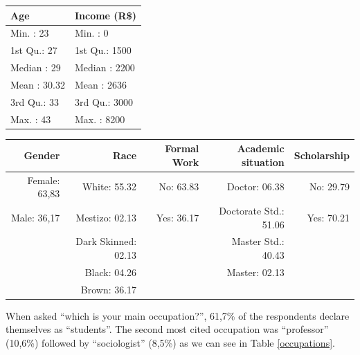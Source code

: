 \documentclass[a4paper, 12pt, openright, oneside, article, german, french, brazil, english]{abntex2}
\begin{document}
\begin{table}[ht]
	{\begin{tabular}{p{4cm}p{4cm}}
		\hline
		Age & Income (R\$) \\ 
		\hline
		Min.   : 23   & Min.   :   0   \\ 
		1st Qu.: 27   & 1st Qu.: 1500   \\ 
		Median : 29   & Median : 2200   \\ 
		Mean   : 30.32 & Mean   : 2636   \\ 
		3rd Qu.: 33   & 3rd Qu.: 3000   \\ 
		Max.   : 43   & Max.   : 8200   \\ 
		\hline
	\end{tabular}
}
	{}
\end{table}


\begin{table}[ht]
	{\begin{tabular}{rrrrr}
		\hline
		Gender & Race & Formal Work & Academic situation & Scholarship \\ 
		\hline
		Female: 63,83   & White: 55.32   & No: 63.83  & Doctor: 06.38   & No: 29.79 \\ 
		Male: 36,17      & Mestizo: 02.13   & Yes: 36.17 & Doctorate Std.: 51.06  & Yes: 70.21 \\ 
						 & Dark Skinned: 02.13   &  & Master Std.: 40.43 &  \\ 
					 	 & Black: 04.26   &  & Master: 02.13 &  \\ 
					 	 & Brown: 36.17   &  &  &  \\ 
		\hline
	\end{tabular}
}
	{}
\end{table}


When asked ``which is your main occupation?'', 61,7\% of the respondents declare themselves as ``students''. The second most cited occupation was ``professor'' (10,6\%) followed by ``sociologist'' (8,5\%) as we can see in Table \ref{occupations}.
\end{document}
